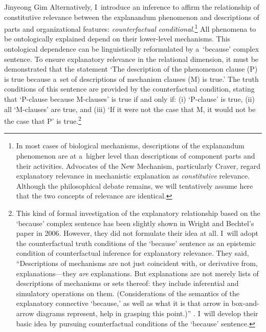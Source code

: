 \begin{artengenv}{Jinyeong Gim}
Alternatively, I~introduce an inference to affirm the relationship of constitutive relevance between the explanandum phenomenon and descriptions of parts and organizational features: \textit{counterfactual conditional}.\footnote{In most cases of biological mechanisms, descriptions of the explanandum phenomenon are at a~higher level than descriptions of component parts and their activities. Advocates of the New Mechanism, particularly Craver, regard explanatory relevance in mechanistic explanation as \textit{constitutive} relevance. Although the philosophical debate remains, we will tentatively assume here that the two concepts of relevance are identical.} All phenomena to be ontologically explained depend on their lower-level mechanisms. This ontological dependence can be linguistically reformulated by a~‘because' complex sentence. To ensure explanatory relevance in the relational dimension, it must be demonstrated that the statement ‘The description of the phenomenon clause (P) is true because a~set of descriptions of mechanism clauses (M) is true.' The truth conditions of this sentence are provided by the counterfactual condition, stating that ‘P-clause because M-clauses' is true if and only if: (i) ‘P-clause' is true, (ii) all ‘M-clauses' are true, and (iii) ‘If it were not the case that M, it would not be the case that P' is true.\footnote{This kind of formal investigation of the explanatory relationship based on the ‘because' complex sentence has been slightly shown in Wright and Bechtel's paper in 2006. However, they did not formulate their idea at all. I~will adopt the counterfactual truth conditions of the ‘because' sentence as an epistemic condition of counterfactual inference for explanatory relevance. They said, ``Descriptions of mechanisms are not just coincident with, or derivative from, explanations---they \textit{are} explanations. But explanations are not merely lists of descriptions of mechanisms or sets thereof: they include inferential and simulatory operations on them. (Considerations of the semantics of the explanatory connective ‘because,' as well as what it is that arrow in box-and-arrow diagrams represent, help in grasping this point.)''
\parencite[][emphasis original]{wright_mechanisms_2007}. %
 I~will develop their basic idea by pursuing counterfactual conditions of the ‘because' sentence.}


\end{artengenv}
